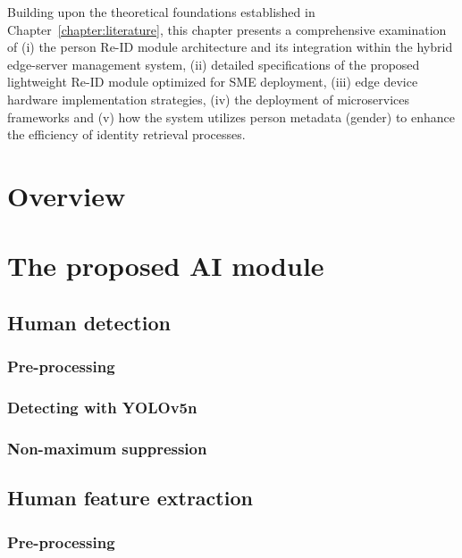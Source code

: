 \documentclass[../main.tex]{subfiles}
\begin{document}
Building upon the theoretical foundations established in Chapter~\ref{chapter:literature}, this chapter presents a comprehensive examination of (i) the person Re-ID module architecture and its integration within the hybrid edge-server management system, (ii) detailed specifications of the proposed lightweight Re-ID module optimized for SME deployment, (iii) edge device hardware implementation strategies, (iv) the deployment of microservices frameworks and (v) how the system utilizes person metadata (gender) to enhance the efficiency of identity retrieval processes.

\section{Overview}
\label{sec:overview}


\section{The proposed AI module}
\label{sec:flow}

\subsection{Human detection}
\label{subsec:hudect}


\subsubsection{Pre-processing}


\subsubsection{Detecting with YOLOv5n}


\subsubsection{Non-maximum suppression}


\subsection{Human feature extraction}


\subsubsection{Pre-processing}
\end{document}
